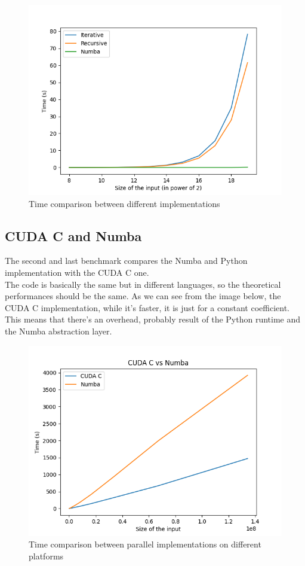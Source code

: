 \documentclass[a4paper, 12pt, oneside]{article}
\begin{document}
\begin{figure}[!h]
  \includegraphics[width=400pt]{images/cpu_vs_gpu.png}
  \caption{Time comparison between different implementations}
\end{figure}

\subsection{CUDA C and Numba}

The second and last benchmark compares the Numba and Python implementation with the CUDA C one.\\
The code is basically the same but in different languages, so the theoretical performances should be the same.
As we can see from the image below, the CUDA C implementation, while it's faster, it is just for a constant coefficient.\\
This means that there's an overhead, probably result of the Python runtime and the Numba abstraction layer.

\begin{figure}[!h]
  \includegraphics[width=400pt]{images/cpp_vs_py_2.png}
  \caption{Time comparison between parallel implementations on different platforms}
\end{figure}
\end{document}
